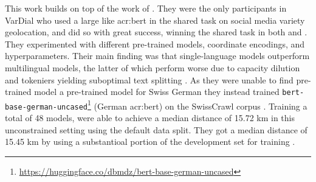 This work builds on top of the work of \cite{scherrerHeLjuVarDial20202020,scherrerSocialMediaVariety2021}. They were the only participants in VarDial who used a large  like \acrshort{acr:bert} in the shared task on social media variety geolocation, and did so with great success, winning the shared task in both \citeyear{scherrerHeLjuVarDial20202020} and \citeyear{scherrerSocialMediaVariety2021}. They experimented with different pre-trained models, coordinate encodings, and hyperparameters. Their main finding was that single-language models outperform multilingual models, the latter of which perform worse due to capacity dilution and tokeniers yielding suboptimal text splitting \citep[3]{scherrerHeLjuVarDial20202020}. As they were unable to find pre-trained model a pre-trained model for Swiss German they instead trained \texttt{bert-base-german-uncased}\footnote{\url{https://huggingface.co/dbmdz/bert-base-german-uncased}} (German \acrshort{acr:bert}) on the SwissCrawl corpus \citep{linderAutomaticCreationText2020}. Training a total of 48 models, \citeauthor{scherrerHeLjuVarDial20202020} were able to achieve a median distance of 15.72 km in this unconstrained setting using the default data split. They got a median distance of 15.45 km by using a substantioal portion of the development set for training \citep[6]{scherrerHeLjuVarDial20202020}.